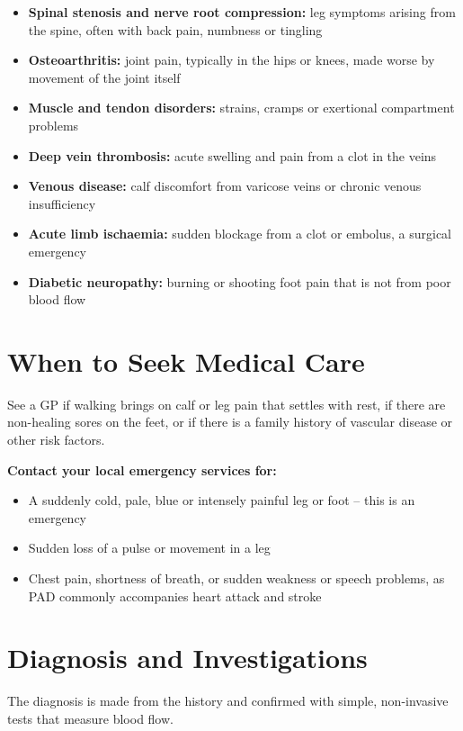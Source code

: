 \begin{itemize}
    \item \textbf{Spinal stenosis and nerve root compression:} leg symptoms arising from the spine, often with back pain, numbness or tingling
    \item \textbf{Osteoarthritis:} joint pain, typically in the hips or knees, made worse by movement of the joint itself
    \item \textbf{Muscle and tendon disorders:} strains, cramps or exertional compartment problems
    \item \textbf{Deep vein thrombosis:} acute swelling and pain from a clot in the veins
    \item \textbf{Venous disease:} calf discomfort from varicose veins or chronic venous insufficiency
    \item \textbf{Acute limb ischaemia:} sudden blockage from a clot or embolus, a surgical emergency
    \item \textbf{Diabetic neuropathy:} burning or shooting foot pain that is not from poor blood flow
\end{itemize}

\section*{When to Seek Medical Care}
See a GP if walking brings on calf or leg pain that settles with rest, if there are non-healing sores on the feet, or if there is a family history of vascular disease or other risk factors.

\textbf{Contact your local emergency services for:}
\begin{itemize}
    \item A suddenly cold, pale, blue or intensely painful leg or foot -- this is an emergency
    \item Sudden loss of a pulse or movement in a leg
    \item Chest pain, shortness of breath, or sudden weakness or speech problems, as PAD commonly accompanies heart attack and stroke
\end{itemize}

\section*{Diagnosis and Investigations}
The diagnosis is made from the history and confirmed with simple, non-invasive tests that measure blood flow.

